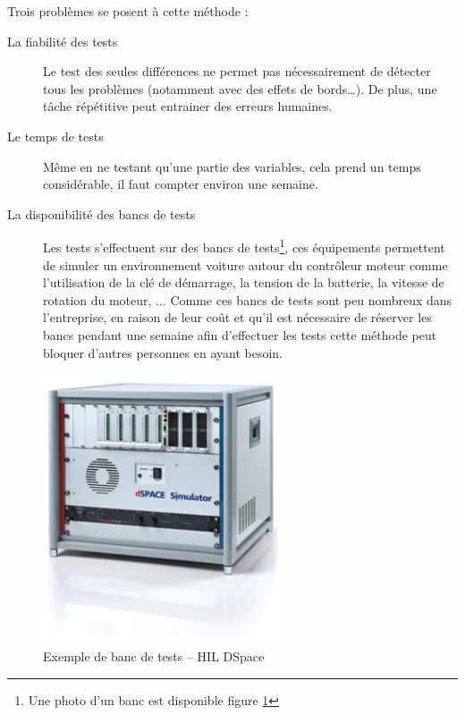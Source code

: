	Trois problèmes se posent à cette méthode : 
	\begin{description}
		\item[La fiabilité des tests] Le test des seules différences ne permet pas nécessairement de détecter tous les problèmes (notamment avec des effets de bords…). De plus, une tâche répétitive peut entrainer des erreurs humaines.
		\item[Le temps de tests] Même en ne testant qu'une partie des variables, cela prend un temps considérable, il faut compter environ une semaine.
		\item[La disponibilité des bancs de tests]	Les tests s'effectuent sur des bancs de tests\footnote{Une photo d'un banc est disponible figure \ref{fig:photoHil}}, ces équipements permettent de simuler un environnement voiture autour du contrôleur moteur comme l'utilisation de la clé de démarrage, la tension de la batterie, la vitesse de rotation du moteur, ... Comme ces bancs de tests sont peu nombreux dans l'entreprise, en raison de leur coût et qu'il est nécessaire de réserver les bancs pendant une semaine afin d'effectuer les tests cette méthode peut bloquer d'autres personnes en ayant besoin.
	\end{description}
	\begin{figure}[H]
		\centering
		\includegraphics[width=7cm]{contents/images/hil.jpg}
		\caption{Exemple de banc de tests -- HIL DSpace}
		\label{fig:photoHil}
	\end{figure}

